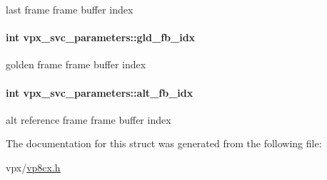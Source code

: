 last frame frame buffer index \hypertarget{structvpx__svc__parameters_a1465c3f1805fe1ccf45835b980ee113e}{
\paragraph[{gld\+\_\+fb\+\_\+idx}]{\setlength{\rightskip}{0pt plus 5cm}int vpx\+\_\+svc\+\_\+parameters\+::gld\+\_\+fb\+\_\+idx}}\label{structvpx__svc__parameters_a1465c3f1805fe1ccf45835b980ee113e}
golden frame frame buffer index \hypertarget{structvpx__svc__parameters_acca4a8ad748ae875e046daece3cd6590}{
\paragraph[{alt\+\_\+fb\+\_\+idx}]{\setlength{\rightskip}{0pt plus 5cm}int vpx\+\_\+svc\+\_\+parameters\+::alt\+\_\+fb\+\_\+idx}}\label{structvpx__svc__parameters_acca4a8ad748ae875e046daece3cd6590}
alt reference frame frame buffer index 

The documentation for this struct was generated from the following file\+:\begin{DoxyCompactItemize}
\item 
vpx/\hyperlink{vp8cx_8h}{vp8cx.\+h}\end{DoxyCompactItemize}
